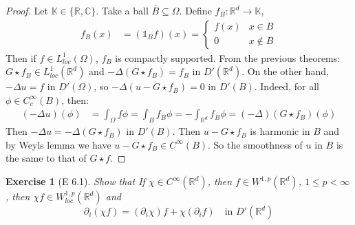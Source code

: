 \documentclass{report}
\theoremstyle{tommy}
\newtheorem{ex}[defn]{Exercise}
\begin{document}
  \begin{proof}
    Let \(\mathbb{K} \in \{\mathbb{R}, \mathbb{C}\}\).
    Take a ball \(\overline B \subseteq \Omega\). Define \(f_B: \mathbb{R}^d \to \mathbb{K}\), \begin{align*}
      f_B(x) &= (\mathbb{1}_B f)(x) = \begin{cases}
        f(x) & x \in B \\ 0 & x \notin B
      \end{cases}
    \end{align*}
    Then if \(f \in L_{loc}^1(\Omega)\), \(f_B\) is compactly supported. From the previous theorems: \(G \star f_B \in L_{loc}^1(\mathbb{R}^d)\) and \(- \Delta (G \star f_B) = f_B\) in \(D'(\mathbb{R}^d)\). On the other hand, \(- \Delta u = f\) in \(D'(\Omega)\), so \(- \Delta(u - G \star f_B) = 0\) in \(D'(B)\). Indeed, for all \(\phi \in C_c^\infty(B)\), then:
    \begin{align*}
      (- \Delta u)(\phi) &= \int_\Omega f \phi = \int_B f_B \phi = - \int_{\mathbb{R}^d} f_B \phi = (-\Delta)(G \star f_B)(\phi)
    \end{align*}
    Then \(- \Delta u = - \Delta (G \star f_B)\) in \(D'(B)\). Then \(u - G \star f_B\) is harmonic in \(B\) and by Weyls lemma we have \(u - G \star f_B \in C^\infty(B)\). So the smoothness of \(u\) in \(B\) is the same to that of \(G \star f\).
  \end{proof}


  \begin{ex}[E 6.1]
    Show that If \(\chi \in C^\infty(\mathbb{R}^d)\), then \(f \in W^{1,p}(\mathbb{R}^d)\), \(1 \le p < \infty\), then \(\chi f \in W_{loc}^{1, p}(\mathbb{R}^d)\) and 
    \[\partial_i (\chi f) = (\partial_i \chi) f + \chi(\partial_i f) \quad \text{in } D'(\mathbb{R}^d)\]
  \end{ex}
\end{document}
